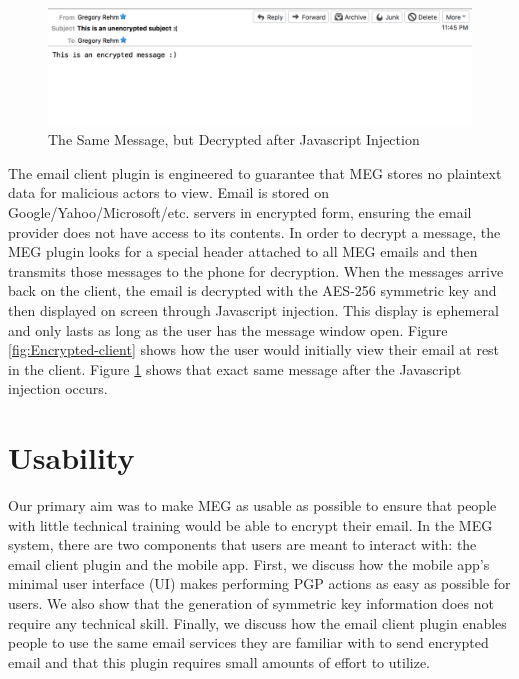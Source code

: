 \documentclass{sig-alternate-05-2015}
\begin{document}
\begin{figure}[H]
    \centering
    \includegraphics[scale=.45]{decrypted-msg.png}
    \caption{The Same Message, but Decrypted after Javascript Injection}
    \label{fig:Decrypted-client}
\end{figure}
\par The email client plugin is engineered to guarantee that MEG stores no plaintext data for malicious actors to view. Email is stored on Google/Yahoo/Microsoft/etc. servers in encrypted form, ensuring the email provider does not have access to its contents. In order to decrypt a message, the MEG plugin looks for a special header attached to all MEG emails and then transmits those messages to the phone for decryption. When the messages arrive back on the client, the email is decrypted with the AES-256 symmetric key and then displayed on screen through Javascript injection. This display is ephemeral and only lasts as long as the user has the message window open. Figure \ref{fig:Encrypted-client} shows how the user would initially view their email at rest in the client. Figure \ref{fig:Decrypted-client} shows that exact same message after the Javascript injection occurs.

\section{Usability}
Our primary aim was to make MEG as usable as possible to ensure that people with little technical training would be able to encrypt their email. In the MEG system, there are two components that users are meant to interact with: the email client plugin and the mobile app. First, we discuss how the mobile app's minimal user interface (UI) makes performing PGP actions as easy as possible for users. We also show that the generation of symmetric key information does not require any technical skill. Finally, we discuss how the email client plugin enables people to use the same email services they are familiar with to send encrypted email and that this plugin requires small amounts of effort to utilize.
\end{document}
